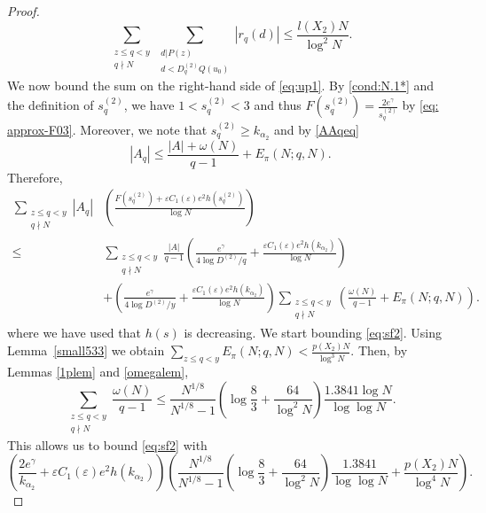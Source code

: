 \documentclass[12pt]{amsart}
\begin{document}
\begin{proof}
\begin{equation}
\label{eq:rsup}
\sum_{\substack{z \le q < y\\q\nmid N}}\sum_{\substack{d|P(z)\\d<D^{(2)}_qQ(u_0)}}\left|r_{q} (d)\right|\le \frac{l(X_2)N}{\log^2 N}.
\end{equation}
We now bound the sum on the right-hand side of \eqref{eq:up1}. By \eqref{cond:N.1*} and the definition of $s^{(2)}_q$, we have $1< s^{(2)}_q<3$ and thus $F(s^{(2)}_q)=\frac{2e^{\gamma}}{s^{(2)}_q}$ by \eqref{eq: approx-F03}. Moreover, we note that $s^{(2)}_q\ge k_{\alpha_2}$ and by \eqref{AAqeq} 
\begin{equation*}
    \left|A_q\right|\le \frac{\left|A\right|+\omega(N)}{q-1}+E_{\pi}(N;q,N).
\end{equation*}
Therefore, 
\begin{align}
\nonumber
\sum_{\substack{z \le q < y\\q\nmid N}}\left|A_q\right|&\left(\frac{F(s^{(2)}_q)+\varepsilon C_{1}(\varepsilon) e^2 h(s^{(2)}_q)}{\log N}\right)
\\\le &
\label{eq:sf1}
 \sum_{\substack{z \le q < y\\q\nmid N}}\frac{\left|A\right|}{q-1} \left(\frac{ e^{\gamma}}{4\log D^{(2)}/q}+\frac{\varepsilon C_{1}(\varepsilon) e^2 h(k_{\alpha_2})}{\log N}\right)
 \\&
\label{eq:sf2}
+ \left(\frac{ e^{\gamma}}{4\log D^{(2)}/y}
+\frac{\varepsilon C_{1}(\varepsilon) e^2 h(k_{\alpha_2})}{\log N}\right)\sum_{\substack{z \le q < y\\q\nmid N}} \left(\frac{\omega(N)}{q-1} +E_{\pi}(N;q,N)\right).
\end{align}
where we have used that $h(s)$ is decreasing. We start bounding \eqref{eq:sf2}. Using Lemma~\ref{small533} we obtain $\sum_{z \le q < y} E_{\pi}(N;q,N)<\frac{p(X_2)N}{\log^3N}$. Then, by Lemmas \ref{1plem} and \ref{omegalem},
\begin{equation*}
\sum_{\substack{z \le q < y\\q\nmid N}}\frac{\omega(N)}{q-1}\le \frac{N^{1/8}}{N^{1/8}-1} \left(\log \frac{8}{3}+\frac{64}{\log^2N}\right)\frac{1.3841\log N}{\log \log N}.
\end{equation*}
This allows us to bound \eqref{eq:sf2} with
\begin{equation}
\label{eq:sf22}
    \left(\frac{ 2e^{\gamma}}{k_{\alpha_2}}+\varepsilon C_{1}(\varepsilon) e^2 h(k_{\alpha_2})\right)\left(\frac{N^{1/8}}{N^{1/8}-1}\left(\log \frac{8}{3}+\frac{64}{\log^2N}\right)\frac{1.3841}{\log \log N} +\frac{p(X_2)N}{\log^4N}\right).

\end{equation}
\end{proof}
\end{document}
